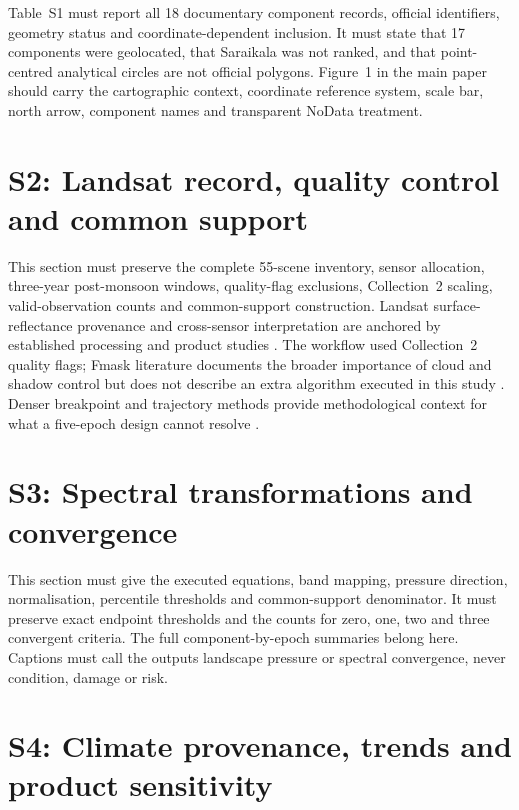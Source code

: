 \setcounter{table}{0}

Table~S1 must report all 18 documentary component records, official identifiers, geometry status and coordinate-dependent inclusion. It must state that 17 components were geolocated, that Saraikala was not ranked, and that point-centred analytical circles are not official polygons. Figure~1 in the main paper should carry the cartographic context, coordinate reference system, scale bar, north arrow, component names and transparent NoData treatment.





\section{S2: Landsat record, quality control and common support}

This section must preserve the complete 55-scene inventory, sensor allocation, three-year post-monsoon windows, quality-flag exclusions, Collection~2 scaling, valid-observation counts and common-support construction. Landsat surface-reflectance provenance and cross-sensor interpretation are anchored by established processing and product studies \citep{masek2006ledaps,vermote2016landsat,roy2016landsat}. The workflow used Collection~2 quality flags; Fmask literature documents the broader importance of cloud and shadow control but does not describe an extra algorithm executed in this study \citep{zhu2012fmask,zhu2015fmask}. Denser breakpoint and trajectory methods provide methodological context for what a five-epoch design cannot resolve \citep{verbesselt2010bfast,kennedy2010landtrendr}.

\section{S3: Spectral transformations and convergence}

This section must give the executed equations, band mapping, pressure direction, normalisation, percentile thresholds and common-support denominator. It must preserve exact endpoint thresholds and the counts for zero, one, two and three convergent criteria. The full component-by-epoch summaries belong here. Captions must call the outputs landscape pressure or spectral convergence, never condition, damage or risk.

\section{S4: Climate provenance, trends and product sensitivity}

